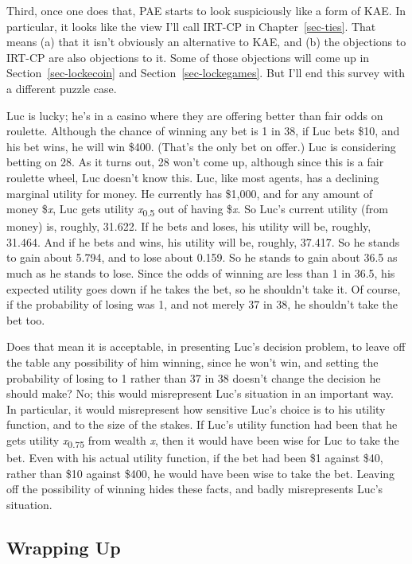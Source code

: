 \documentclass[
  12pt,
  letterpaper,
]{scrbook}
\begin{document}
Third, once one does that, PAE starts to look suspiciously like a form
of KAE. In particular, it looks like the view I'll call IRT-CP in
Chapter~\ref{sec-ties}. That means (a) that it isn't obviously an
alternative to KAE, and (b) the objections to IRT-CP are also objections
to it. Some of those objections will come up in
Section~\ref{sec-lockecoin} and Section~\ref{sec-lockegames}. But I'll
end this survey with a different puzzle case.

Luc is lucky; he's in a casino where they are offering better than fair
odds on roulette. Although the chance of winning any bet is 1 in 38, if
Luc bets \$10, and his bet wins, he will win \$400. (That's the only bet
on offer.) Luc is considering betting on 28. As it turns out, 28 won't
come up, although since this is a fair roulette wheel, Luc doesn't know
this. Luc, like most agents, has a declining marginal utility for money.
He currently has \$1,000, and for any amount of money \$\emph{x}, Luc
gets utility \emph{x}\textsubscript{0.5} out of having \$\emph{x}. So
Luc's current utility (from money) is, roughly, 31.622. If he bets and
loses, his utility will be, roughly, 31.464. And if he bets and wins,
his utility will be, roughly, 37.417. So he stands to gain about 5.794,
and to lose about 0.159. So he stands to gain about 36.5 as much as he
stands to lose. Since the odds of winning are less than 1 in 36.5, his
expected utility goes down if he takes the bet, so he shouldn't take it.
Of course, if the probability of losing was 1, and not merely 37 in 38,
he shouldn't take the bet too.

Does that mean it is acceptable, in presenting Luc's decision problem,
to leave off the table any possibility of him winning, since he won't
win, and setting the probability of losing to 1 rather than 37 in 38
doesn't change the decision he should make? No; this would misrepresent
Luc's situation in an important way. In particular, it would
misrepresent how sensitive Luc's choice is to his utility function, and
to the size of the stakes. If Luc's utility function had been that he
gets utility \emph{x}\textsubscript{0.75} from wealth \emph{x}, then it
would have been wise for Luc to take the bet. Even with his actual
utility function, if the bet had been \$1 against \$40, rather than \$10
against \$400, he would have been wise to take the bet. Leaving off the
possibility of winning hides these facts, and badly misrepresents Luc's
situation.

\subsection{Wrapping Up}\label{sec-kae-wrapping-ip}
\end{document}
